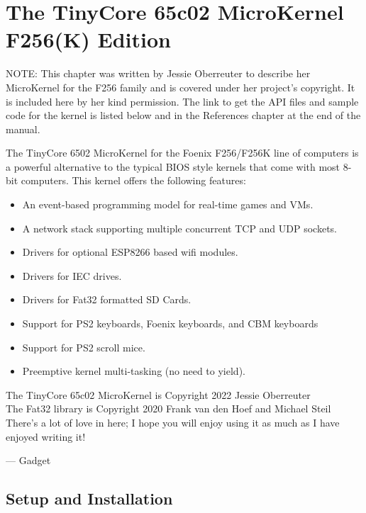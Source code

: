 \chapter{The TinyCore 65c02 MicroKernel F256(K) Edition}
\label{chp:kernel}

\begin{leftbar}
  NOTE: This chapter was written by Jessie Oberreuter to describe her MicroKernel for the F256 family and is covered under her project's copyright. It is included here by her kind permission. The link to get the API files and sample code for the kernel is listed below and in the References chapter at the end of the manual.
\end{leftbar}
  
The TinyCore 6502 MicroKernel for the Foenix F256/F256K line of computers is a powerful alternative to the typical BIOS style kernels that come with most 8-bit computers.  This kernel offers the following features:

\begin{itemize}
    \item An event-based programming model for real-time games and VMs.
    \item A network stack supporting multiple concurrent TCP and UDP sockets.
    \item Drivers for optional ESP8266 based wifi modules.
    \item Drivers for IEC drives.
    \item Drivers for Fat32 formatted SD Cards.
    \item Support for PS2 keyboards, Foenix keyboards, and CBM keyboards
    \item Support for PS2 scroll mice.
    \item Preemptive kernel multi-tasking (no need to yield). 
\end{itemize}

\noindent The TinyCore 65c02 MicroKernel is Copyright 2022 Jessie Oberreuter \\
The Fat32 library is Copyright 2020 Frank van den Hoef and Michael Steil \\

\noindent There's a lot of love in here; I hope you will enjoy using it as much as I have enjoyed writing it!

\hfill --- Gadget

\section*{Setup and Installation}

